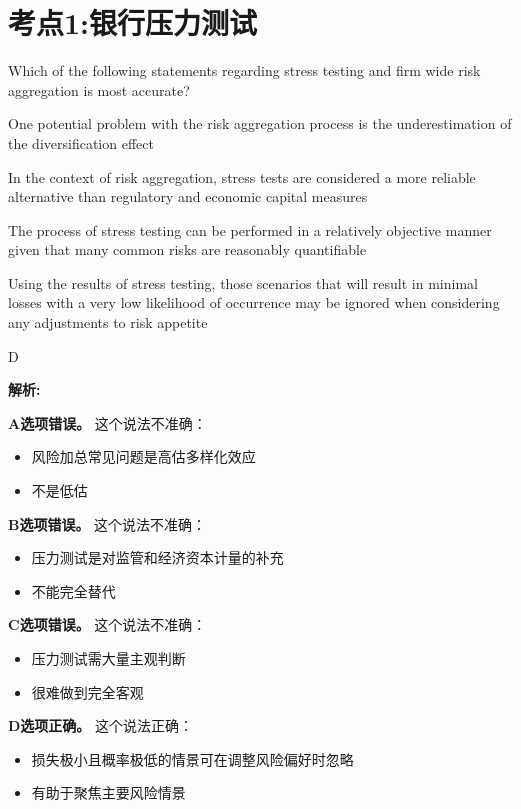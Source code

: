 \documentclass{article}
\newcounter{question} %
\newenvironment{explanation}
{\textbf{解析:}\par}
{\par}
\begin{document}
 \tableofcontents %
\newpage




\section{考点1:银行压力测试}
\setcounter{question}{0}

\begin{question}
    Which of the following statements regarding stress testing and firm wide risk aggregation is most accurate?
\end{question}

\begin{choices}
    \item One potential problem with the risk aggregation process is the underestimation of the diversification effect
    \item In the context of risk aggregation, stress tests are considered a more reliable alternative than regulatory and economic capital measures
    \item The process of stress testing can be performed in a relatively objective manner given that many common risks are reasonably quantifiable
    \item Using the results of stress testing, those scenarios that will result in minimal losses with a very low likelihood of occurrence may be ignored when considering any adjustments to risk appetite
\end{choices}

\begin{correctanswer}
    D
\end{correctanswer}

\begin{explanation}
    \textbf{A选项错误。}
    这个说法不准确：
    \begin{itemize}
        \item 风险加总常见问题是高估多样化效应
        \item 不是低估
    \end{itemize}

    \textbf{B选项错误。}
    这个说法不准确：
    \begin{itemize}
        \item 压力测试是对监管和经济资本计量的补充
        \item 不能完全替代
    \end{itemize}

    \textbf{C选项错误。}
    这个说法不准确：
    \begin{itemize}
        \item 压力测试需大量主观判断
        \item 很难做到完全客观
    \end{itemize}

    \textbf{D选项正确。}
    这个说法正确：
    \begin{itemize}
        \item 损失极小且概率极低的情景可在调整风险偏好时忽略
        \item 有助于聚焦主要风险情景
    \end{itemize}
\end{explanation}
\end{document}
